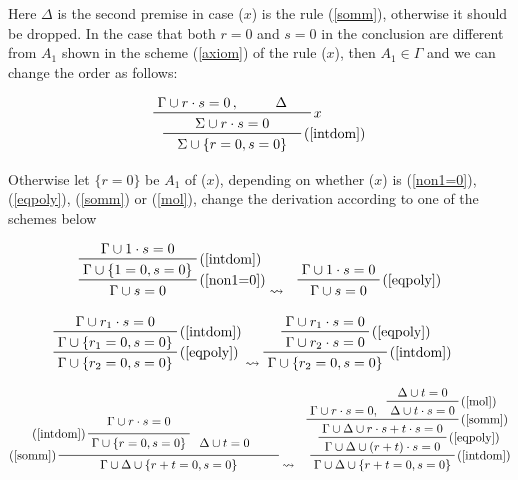 \documentclass[a4paper,12pt,oneside]{book}
\begin{document}
\noindent Here $\Delta$ is the second premise in case ($x$) is the rule (\ref{somm}), otherwise it should be dropped. In the case that both $r=0$ and $s=0$ in the conclusion are different from $A_1$  shown in the scheme (\ref{axiom}) of the rule ($x$), then $A_1\in\Gamma$  and we can change the order as follows:

$$
\prftree[r]{(\ref{intdom})}
{\prftree[r]{$x$}
{\Gamma\cup r\cdot s=0 \, , \hspace{7mm}}    {\Delta \hspace{5mm}}
{\hspace{7mm}\Sigma\cup r\cdot s=0 \hspace{7mm}}}
{ {\Sigma\cup\{r=0, s=0 \}}} 
$$

\noindent Otherwise let $\{r=0\}$ be $A_1$ of ($x$), depending on whether ($x$) is (\ref{non1=0}),(\ref{eqpoly}), (\ref{somm}) or (\ref{mol}), change the derivation according to one of the schemes below


\begin{eqnarray*}
\prftree[r]{(\ref{non1=0})} { \prftree[r]{(\ref{intdom})} {\Gamma \cup  1\cdot s=0 } {\Gamma \cup  \{1=0, s=0\}} } {\Gamma \cup s=0 }
&  \leadsto 
 &\prftree[r]{(\ref{eqpoly})} { \Gamma \cup 1\cdot s=0    } {\Gamma \cup s=0}
\end{eqnarray*}



\begin{eqnarray*}
\prftree[r]{(\ref{eqpoly})} { \prftree[r]{(\ref{intdom})} {\Gamma \cup  r_1\cdot s=0} {\Gamma \cup  \{r_1=0, s=0\}} } {\Gamma \cup \{r_2=0, s=0\}}
&  \leadsto 
\prftree[r]{(\ref{intdom})} { \prftree[r]{(\ref{eqpoly})} {\Gamma \cup  r_1\cdot s=0} {\Gamma \cup  r_2\cdot s=0} } {\Gamma \cup \{r_2=0, s=0\}}
\end{eqnarray*}


\begin{eqnarray*}
\prfrulenameskip=0.4em\prflinepadbefore=1ex
\prftree[l]{(\ref{somm})} { \prftree[l]{(\ref{intdom})} { \Gamma \cup  r\cdot s=0} { \Gamma \cup \{ r=0,s=0\} }  }{ \Delta \cup t=0 }
{\hspace{11mm}\Gamma \cup \Delta \cup\{r+t=0, s=0\}\hspace{11mm}}
& \leadsto
& \prftree[r]{(\ref{intdom})} 
{\prftree[r]{(\ref{eqpoly})}
{ 
\prftree[r]{(\ref{somm})}{\Gamma \cup r\cdot s=0,} 
{ \prftree[r]{(\ref{mol})} {\Delta \cup t=0  }  {\Delta \cup t\cdot s=0 }}
{\Gamma \cup \Delta \cup r\cdot s+t\cdot s=0 }
}
{\Gamma \cup \Delta \cup (r+t)\cdot s=0 }
}
{\Gamma \cup \Delta \cup\{r+t=0, s=0\}}
\end{eqnarray*}
\end{document}
